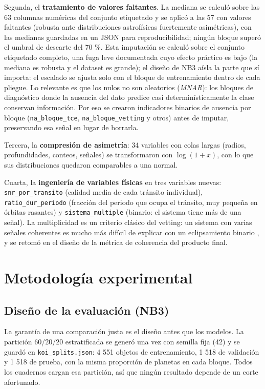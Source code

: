 \documentclass[a4paper,12pt]{article}
\begin{document}
  Segunda, el \textbf{tratamiento de valores faltantes}. La mediana se calculó
  sobre las 63 columnas numéricas del conjunto etiquetado y se aplicó a las 57 con
  valores faltantes (robusta ante distribuciones astrofísicas fuertemente
  asimétricas), con las medianas guardadas en un JSON para reproducibilidad; ningún
  bloque superó el umbral de descarte del 70 \%. Esta imputación se calculó sobre el
  conjunto etiquetado completo, una fuga leve documentada cuyo efecto práctico es
  bajo (la mediana es robusta y el dataset es grande); el diseño de NB3 aísla la
  parte que sí importa: el escalado se ajusta solo con el bloque de entrenamiento
  dentro de cada pliegue. Lo relevante es que los nulos no son aleatorios
  (\textit{MNAR}): los bloques de diagnóstico donde la ausencia del dato predice
  casi determinísticamente la clase conservan información. Por eso se crearon
  indicadores binarios de ausencia por bloque (\texttt{na\_bloque\_tce},
  \texttt{na\_bloque\_vetting} y otros) antes de imputar, preservando esa señal en
  lugar de borrarla.

  Tercera, la \textbf{compresión de asimetría}: 34 variables con colas largas
  (radios, profundidades, conteos, señales) se transformaron con $\log(1+x)$, con
  lo que sus distribuciones quedaron comparables a una normal.

  Cuarta, la \textbf{ingeniería de variables físicas} en tres variables nuevas:
  \texttt{snr\_por\_transito} (calidad media de cada tránsito individual),
  \texttt{ratio\_dur\_periodo} (fracción del periodo que ocupa el tránsito, muy
  pequeña en órbitas rasantes) y \texttt{sistema\_multiple} (binario: el sistema
  tiene más de una señal). La multiplicidad es un criterio clásico del vetting:
  un sistema con varias señales coherentes es mucho más difícil de explicar con un
  eclipsamiento binario \cite{lissauer2012}, y se retomó en el diseño de la métrica
  de coherencia del producto final.

  \section{Metodología experimental}

  \subsection{Diseño de la evaluación (NB3)}

  La garantía de una comparación justa es el diseño antes que los modelos. La
  partición 60/20/20 estratificada se generó una vez con semilla fija (42) y se
  guardó en \texttt{koi\_splits.json}: 4 551 objetos de entrenamiento, 1 518 de
  validación y 1 518 de prueba, con la misma proporción de planetas en cada
  bloque. Todos los cuadernos cargan esa partición, así que ningún resultado
  depende de un corte afortunado.
\end{document}
